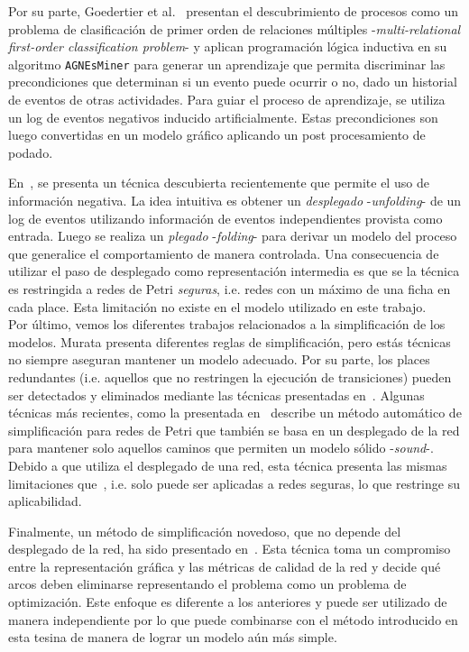 Por su parte, Goedertier et al.~\cite{Goedertier2009} 
presentan el descubrimiento de procesos como un problema de clasificación de primer orden de relaciones
múltiples -\textit{multi-relational first-order classification problem}- y aplican programación lógica
inductiva en su algoritmo \texttt{AGNEsMiner} para generar un aprendizaje que permita discriminar
las precondiciones que determinan si un evento puede ocurrir o no, dado un historial de eventos
de otras actividades.  Para guiar el proceso de aprendizaje, se utiliza un log de eventos negativos 
inducido artificialmente. Estas precondiciones son luego convertidas en un modelo gráfico aplicando 
un post procesamiento de podado.

En~\cite{LeonRCHH15}, se presenta un técnica descubierta recientemente que permite el uso de información negativa.
La idea intuitiva es obtener un \textit{desplegado} -\textit{unfolding}- de un log de eventos utilizando 
información de eventos independientes provista como entrada. Luego se realiza un \textit{plegado} -\textit{folding}-
para derivar un modelo del proceso que generalice el comportamiento de manera controlada.
Una consecuencia de utilizar el paso de desplegado como representación intermedia es que se la técnica es restringida
a redes de Petri \textit{seguras}, i.e. redes con un máximo de una ficha en cada place. Esta limitación no existe
en el modelo utilizado en este trabajo.\\


Por último, vemos los diferentes trabajos relacionados a la simplificación de los modelos.
Murata presenta diferentes reglas de simplificación\cite{Murata89}, pero estás técnicas no siempre aseguran mantener
un modelo adecuado.
Por su parte, los places redundantes (i.e. aquellos que no restringen la ejecución de transiciones) pueden ser detectados
y eliminados mediante las técnicas presentadas en~\cite{ColomS89a}. 
Algunas técnicas más recientes, como la presentada en~\cite{FahlandA13} describe un método automático de simplificación para
redes de Petri que también se basa en un desplegado de la red para mantener solo aquellos caminos que permiten un modelo
sólido -\textit{sound}-. Debido a que utiliza el desplegado de una red, esta técnica presenta las mismas limitaciones
que~\cite{LeonRCHH15}, i.e. solo puede ser aplicadas a redes seguras, lo que restringe su aplicabilidad.

Finalmente, un método de simplificación novedoso, que no depende del desplegado de la red, ha sido presentado en~\cite{PedroCC15}.
Esta técnica toma un compromiso entre la representación gráfica y las métricas de calidad de la red y decide qué arcos
deben eliminarse representando el problema como un problema de optimización. Este enfoque es diferente a los anteriores
y puede ser utilizado de manera independiente por lo que puede combinarse con el método introducido en esta tesina
de manera de lograr un modelo aún más simple.

